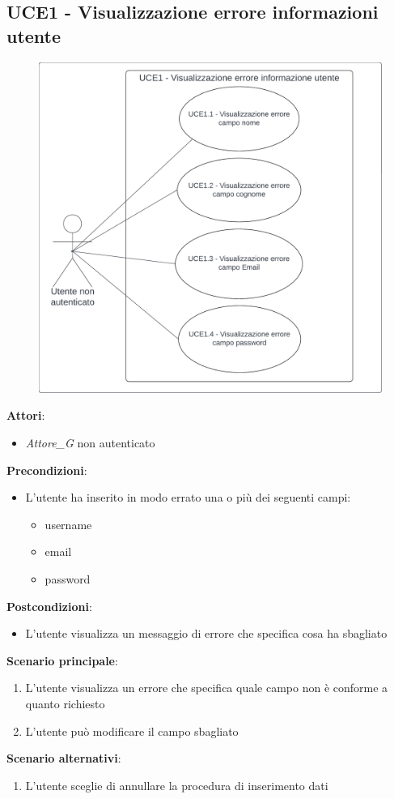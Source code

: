 \subsection{UCE1 - Visualizzazione errore informazioni utente}\label{usecase:e_1}
\begin{figure}[H]
    \centering
    \includegraphics[width=0.75\linewidth]{ucd/UCED1.png}
\end{figure}
\textbf{Attori}:
\begin{itemize}
    \item \textit{Attore_G} non autenticato
\end{itemize}
\textbf{Precondizioni}:
\begin{itemize}
    \item L'utente ha inserito in modo errato una o più dei seguenti campi:
    \begin{itemize}
        \item username
        \item email
        \item password
    \end{itemize}
\end{itemize}
\textbf{Postcondizioni}:
\begin{itemize}
    \item L'utente visualizza un messaggio di errore che specifica cosa ha sbagliato
\end{itemize}
\textbf{Scenario principale}:
\begin{enumerate}
    \item L'utente visualizza un errore che specifica quale campo non è conforme a quanto richiesto
    \item L'utente può modificare il campo sbagliato
\end{enumerate}
\textbf{Scenario alternativi}:
\begin{enumerate}
    \item L'utente sceglie di annullare la procedura di inserimento dati
\end{enumerate}




\newpage